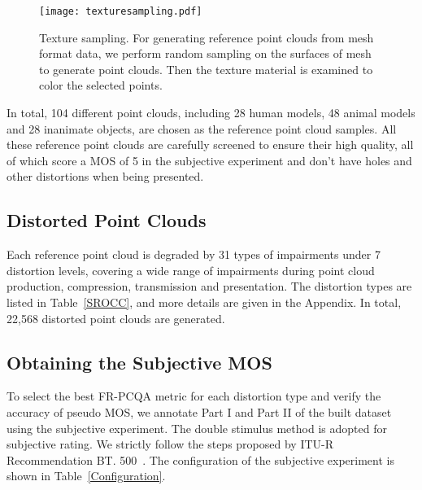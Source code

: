 \documentclass[acmsmall]{acmart}
\begin{document}
\begin{figure}[htbp]
	\centering
	\texttt{[image: texturesampling.pdf]}
	\caption{Texture sampling. For generating reference point clouds from mesh format data, we perform random sampling on the surfaces of mesh to generate point clouds. Then the texture material is examined to color the selected points. }
	\label{texturesampling}

\end{figure}

\par In total, 104 different point clouds, including 28 human models, 48 animal models and 28 inanimate objects, are chosen as the reference point cloud samples. All these reference point clouds are carefully screened to ensure their high quality, all of which score a MOS of 5 in the subjective experiment and don't have holes and other distortions when being presented.


\subsection{Distorted Point Clouds}

\par  Each reference point cloud is degraded by 31 types of impairments under 7 distortion levels, covering a wide range of impairments during point cloud production, compression, transmission and presentation. The distortion types are listed in Table~\ref{SROCC}, and more details are given in the Appendix. In total, 22,568 distorted point clouds are generated.

\subsection{Obtaining the Subjective MOS}

\par To select the best FR-PCQA metric for each distortion type and verify the accuracy of pseudo MOS, we annotate Part I and Part II of the built dataset using the subjective experiment. The double stimulus method is adopted for subjective rating. We strictly follow the steps proposed by ITU-R Recommendation BT. 500~\cite{BT500}. The configuration of the subjective experiment is shown in Table~\ref{Configuration}.
\end{document}

